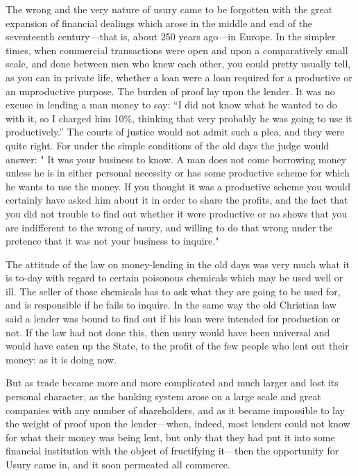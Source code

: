 \documentclass{book}
\begin{document}
The wrong and the very nature of usury came to be forgotten with the great expansion of financial dealings which arose in the middle and end of the seventeenth century—that is, about 250 years ago—in Europe. In the simpler times, when commercial transactions were open and upon a comparatively small scale, and done between men who knew each other, you could pretty usually tell, as you can in private life, whether a loan were a loan required for a productive or an unproductive purpose. The burden of proof lay upon the lender. It was no excuse in lending a man money to say: “I did not know what he wanted to do with it, so I charged him 10\%, thinking that very probably he was going to use it productively.” The courts of justice would not admit such a plea, and they were quite right. For under the simple conditions of the old days the judge would answer: " It was your business to know. A man does not come borrowing money unless he is in either personal necessity or has some productive scheme for which he wants to use the money. If you thought it was a productive scheme you would certainly have asked him about it in order to share the profits, and the fact that you did not trouble to find out whether it were productive or no shows that you are indifferent to the wrong of usury, and willing to do that wrong under the pretence that it was not your business to inquire."

The attitude of the law on money-lending in the old days was very much what it is to-day with regard to certain poisonous chemicals which may be used well or ill. The seller of those chemicals has to ask what they are going to be used for, and is responsible if he fails to inquire. In the same way the old Christian law said a lender was bound to find out if his loan were intended for production or not. If the law had not done this, then usury would have been universal and would have eaten up the State, to the profit of the few people who lent out their money: as it is doing now.

But as trade became more and more complicated and much larger and lost its personal character, as the banking system arose on a large scale and great companies with any number of shareholders, and as it became impossible to lay the weight of proof upon the lender—when, indeed, most lenders could not know for what their money was being lent, but only that they had put it into some financial institution with the object of fructifying it—then the opportunity for Usury came in, and it soon permeated all commerce.
\end{document}
